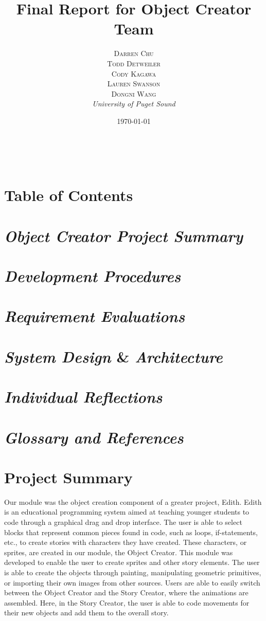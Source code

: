 \documentclass[a4paper, 11pt]{article} %
\title{\textbf{Final Report for Object Creator Team}}
\author{\textsc{Darren Chu\\Todd Detweiler\\Cody Kagawa\\Lauren Swanson\\Dongni Wang} %
\\{\textit{University of Puget Sound}}} %
\date{\today} %
\makeatletter
\renewcommand{\maketitle}{ %
\begin{flushright} %
{\LARGE\@title} %

\vspace{50pt} %

{\large\@author} %
\\\@date %

\vspace{40pt} %
\end{flushright}
}
\makeatother
\begin{document}
\maketitle %
\newpage

\section*{Table of Contents}
\section{\emph{Object Creator Project Summary}}
\section{\emph{Development Procedures}}
\section{\emph{Requirement Evaluations}}
\section{\emph{System Design} \& \emph{Architecture}}
\section{\emph{Individual Reflections}}
\section{\emph{Glossary and References}}   

\newpage

\section*{Project Summary}

Our module was the object creation component of a greater project, Edith. Edith is an educational programming system aimed at teaching younger students to code through a graphical drag and drop interface. The user is able to select blocks that represent common pieces found in code, such as loops, if-statements, etc., to create stories with characters they have created. These characters, or sprites, are created in our module, the Object Creator. This module was developed to enable the user to create sprites and other story elements. The user is able to create the objects through painting, manipulating geometric primitives, or importing their own images from other sources. Users are able to easily switch between the Object Creator and the Story Creator, where the animations are assembled. Here, in the Story Creator, the user is able to code movements for their new objects and add them to the overall story.
\end{document}
